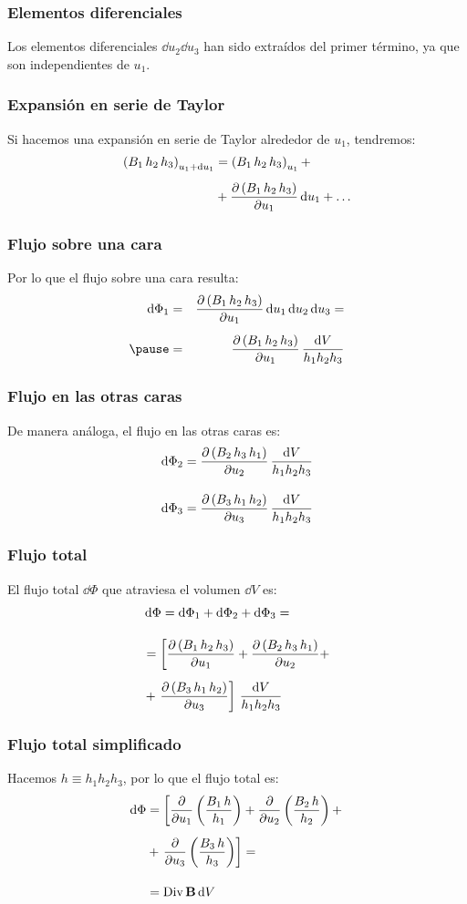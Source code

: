 \documentclass[12pt]{beamer}
\begin{document}
\begin{frame}
\frametitle{Elementos diferenciales}
Los elementos diferenciales $\dd{u_{2}} \dd{u_{3}}$ han sido extraídos del primer término, ya que son independientes de $u_{1}$.
\end{frame}
\begin{frame}
\frametitle{Expansión en serie de Taylor}
Si hacemos una expansión en serie de Taylor alrededor de $u_{1}$, tendremos:
\pause
\begin{align*}
\left( B_{1} \, h_{2} \, h_{3} \right)_{u_{1} + \dd{u_{1}}} &= \left( B_{1} \, h_{2} \, h_{3} \right)_{u_{1}} + \\[0.5em]
&+ \pdv{\left( B_{1} \, h_{2} \, h_{3} \right)}{u_{1}} \dd{u_{1}} + \ldots
\end{align*}
\end{frame}
\begin{frame}
\frametitle{Flujo sobre una cara}
Por lo que el flujo sobre una cara resulta:
\pause
\begin{eqnarray*}
\dd{\Phi_{1}} &=& \pdv{\left( B_{1} \, h_{2} \, h_{3} \right)}{u_{1}} \dd{u_{1}} \dd{u_{2}} \dd{u_{3}} = \\[0.5em] \pause
&=& \pdv{\left( B_{1} \, h_{2} \, h_{3} \right)}{u_{1}} \, \dfrac{\dd{V}}{h_{1} h_{2} h_{3}}
\end{eqnarray*}
\end{frame}
\begin{frame}
\frametitle{Flujo en las otras caras}
De manera análoga, el flujo en las otras caras es:
\pause
\begin{align*}
\dd{\Phi_{2}} &= \pdv{\left( B_{2} \, h_{3} \, h_{1} \right)}{u_{2}} \, \dfrac{\dd{V}}{h_{1} h_{2} h_{3}} \\[1em]
\dd{\Phi_{3}} &= \pdv{\left( B_{3} \, h_{1} \, h_{2} \right)}{u_{3}} \, \dfrac{\dd{V}}{h_{1} h_{2} h_{3}}
\end{align*}
\end{frame}
\begin{frame}
\frametitle{Flujo total}
El flujo total $\dd{\Phi}$ que atraviesa el volumen $\dd{V}$ es:
\pause
\begin{align*}
&\dd{\Phi} = \dd{\Phi_{1}} + \dd{\Phi_{2}} + \dd{\Phi_{3}} = \\[1em]
&= \left[ \pdv{\left( B_{1} \, h_{2} \, h_{3} \right)}{u_{1}} + \pdv{\left( B_{2} \, h_{3} \, h_{1} \right)}{u_{2}} + \right. \\[0.5em] 
&+ \left.  \pdv{\left( B_{3} \, h_{1} \, h_{2} \right)}{u_{3}} \right] \, \dfrac{\dd{V}}{h_{1} h_{2} h_{3}}
\end{align*}
\end{frame}
\begin{frame}
\frametitle{Flujo total simplificado}
Hacemos $h \equiv h_{1} h_{2} h_{3}$, por lo que el flujo total es:
\pause
\begin{align*}
\dd{\Phi} &= \left[ \pdv{u_{1}} \left( \dfrac{B_{1} \, h}{h_{1}} \right) + \pdv{u_{2}} \left( \dfrac{B_{2} \, h}{h_{2}} \right) + \right. \\[0.5em]
&+ \left. \pdv{u_{3}} \left( \dfrac{B_{3} \, h}{h_{3}} \right) \right] = \\[1em]
&= {\rm Div} \, \vb{B} \dd{V}
\end{align*}
\end{frame}
\end{document}
